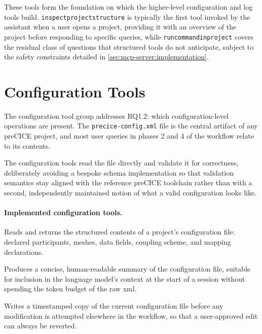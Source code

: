 \documentclass[
  numbers=noenddot,
  english,
  a4paper,
  twoside,
  bibliography=totoc,
  headsepline,
  cleardoublepage=empty,
  parskip=half,
  draft=false
]{scrbook}
\theoremstyle{break}
\renewcommand{\_}{\textunderscore\allowbreak}
\begin{document}
These tools form the foundation on which the higher-level configuration and log tools build.
\texttt{inspect\_project\_structure} is typically the first tool invoked by the assistant when
a user opens a project, providing it with an overview of the project before responding to
specific queries, while \texttt{run\_command\_in\_project} covers the residual class of
questions that structured tools do not anticipate, subject to the safety constraints detailed
in \cref{sec:mcp-server:implementation}.


\section{Configuration Tools}\label{sec:mcp-server:config-tools}

The configuration tool group addresses RQ1.2: which configuration-level operations are present.
The \texttt{precice-config.xml} file is the central artifact of any preCICE project, and most
user queries in phases 2 and 4 of the workflow relate to its contents.

The configuration tools read the file directly and validate it for correctness, 
deliberately avoiding a bespoke schema implementation so that
validation semantics stay aligned with the reference preCICE toolchain rather than with a
second, independently maintained notion of what a valid configuration looks like.

\paragraph{Implemented configuration tools.}

\begin{description}[font=\ttfamily]
  \item[inspect\_precice\_config] Reads and returns the structured contents of a project's
        configuration file: declared participants, meshes, data fields, coupling scheme, and
        mapping declarations.
  \item[summarize\_precice\_config] Produces a concise, human-readable summary of the
        configuration file, suitable for inclusion in the language model's context at the
        start of a session without spending the token budget of the raw \gls{xml}.
  \item[backup\_precice\_config] Writes a timestamped copy of the current configuration file
        before any modification is attempted elsewhere in the workflow, so that a user-approved
        edit can always be reverted.
\end{description}
\end{document}
